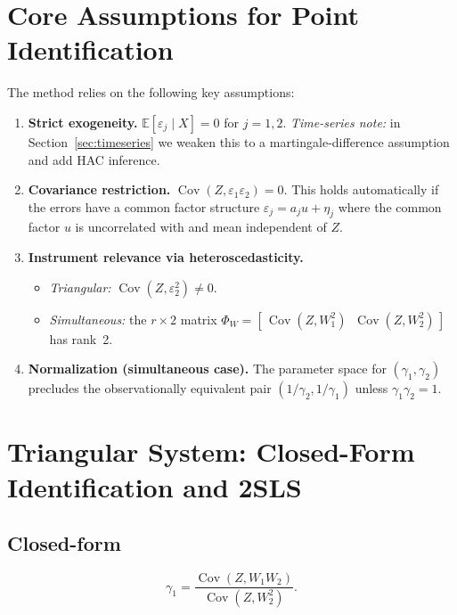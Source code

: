 \documentclass{article}
\newcommand{\E}{\mathbb{E}}
\newcommand{\cov}{\operatorname{Cov}}
\theoremstyle{plain}
\begin{document}
\section{Core Assumptions for Point Identification}

The method relies on the following key assumptions:
\begin{enumerate}[label=(A\arabic*)]
\item \textbf{Strict exogeneity.}
      $\E[\varepsilon_j\mid X]=0$ for $j=1,2$.  
      \emph{Time-series note:} in Section~\ref{sec:timeseries} we weaken this to a martingale-difference assumption and add HAC inference.

\item \textbf{Covariance restriction.}
      $\cov(Z,\varepsilon_1\varepsilon_2)=0$.  
      This holds automatically if the errors have a common factor structure
      \(\varepsilon_j = a_j u + \eta_j\) where the common factor \(u\) is uncorrelated with and mean independent of \(Z\).

\item \textbf{Instrument relevance via heteroscedasticity.}
      \begin{itemize}\itemsep2pt
      \item \emph{Triangular:}
            $\cov(Z,\varepsilon_2^2)\neq0$.
      \item \emph{Simultaneous:}
            the $r\times 2$ matrix
            $\Phi_W = [\,\cov(Z,W_1^2)\;\; \cov(Z,W_2^2)\,]$
            has rank~2.
      \end{itemize}

\item \textbf{Normalization (simultaneous case).}
      The parameter space for \((\gamma_1, \gamma_2)\) precludes the observationally
      equivalent pair \((1/\gamma_2,1/\gamma_1)\) unless
      \(\gamma_1\gamma_2=1\).
\end{enumerate}

\section{Triangular System: Closed-Form Identification and 2SLS}

\subsection{Closed-form}

\begin{equation}\label{eq:gamma1_id}
\gamma_1
  = \frac{\cov(Z,W_1W_2)}{\cov(Z, W_2^2)}.
\end{equation}
\end{document}
